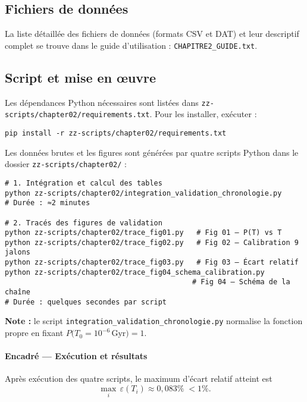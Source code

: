 \subsection{Fichiers de données}

La liste détaillée des fichiers de données (formats CSV et DAT) et leur descriptif complet se trouve dans le guide d’utilisation : \texttt{CHAPITRE2\_GUIDE.txt}.

\subsection{Script et mise en œuvre}

Les dépendances Python nécessaires sont listées dans \texttt{zz-scripts/chapter02/requirements.txt}.
Pour les installer, exécuter :
\begin{verbatim}
pip install -r zz-scripts/chapter02/requirements.txt
\end{verbatim}

Les données brutes et les figures sont générées par quatre scripts Python dans le dossier \texttt{zz-scripts/chapter02/} :

\begin{verbatim}
# 1. Intégration et calcul des tables
python zz-scripts/chapter02/integration_validation_chronologie.py
# Durée : ≈2 minutes

# 2. Tracés des figures de validation
python zz-scripts/chapter02/trace_fig01.py   # Fig 01 – P(T) vs T
python zz-scripts/chapter02/trace_fig02.py   # Fig 02 – Calibration 9 jalons
python zz-scripts/chapter02/trace_fig03.py   # Fig 03 – Écart relatif
python zz-scripts/chapter02/trace_fig04_schema_calibration.py
                                            # Fig 04 – Schéma de la chaîne
# Durée : quelques secondes par script
\end{verbatim}

\noindent\textbf{Note :} le script \texttt{integration\_validation\_chronologie.py} normalise la fonction propre en fixant
\(\displaystyle P\bigl(T_{0}=10^{-6}\,\mathrm{Gyr}\bigr)=1\).

\begin{mdframed}
  \paragraph{Encadré — Exécution et résultats}
  Après exécution des quatre scripts, le maximum d’écart relatif atteint est
  \[
    \max_{i}\,\varepsilon(T_i)\approx0{,}083\%\;<1\%.
  \]
\end{mdframed}

